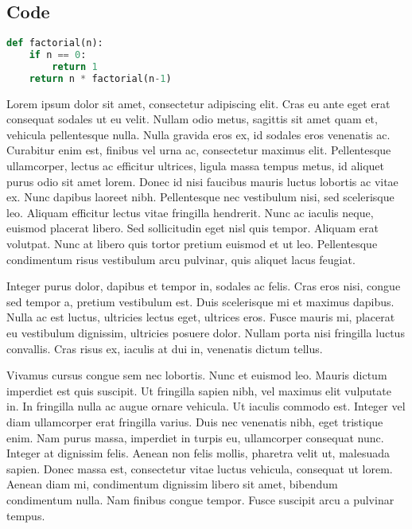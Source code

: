 \documentclass[a4paper,11pt]{article}
\begin{document}
\subsection*{Code}
\begin{lstlisting}[language=Python]
def factorial(n):
    if n == 0:
        return 1
    return n * factorial(n-1)
\end{lstlisting}



Lorem ipsum dolor sit amet, consectetur adipiscing elit. Cras eu ante
eget erat consequat sodales ut eu velit. Nullam odio metus, sagittis sit
 amet quam et, vehicula pellentesque nulla. Nulla gravida eros ex, id
sodales eros venenatis ac. Curabitur enim est, finibus vel urna ac,
consectetur maximus elit. Pellentesque ullamcorper, lectus ac efficitur
ultrices, ligula massa tempus metus, id aliquet purus odio sit amet
lorem. Donec id nisi faucibus mauris luctus lobortis ac vitae ex. Nunc
dapibus laoreet nibh. Pellentesque nec vestibulum nisi, sed scelerisque
leo. Aliquam efficitur lectus vitae fringilla hendrerit. Nunc ac iaculis
 neque, euismod placerat libero. Sed sollicitudin eget nisl quis tempor.
 Aliquam erat volutpat. Nunc at libero quis tortor pretium euismod et ut
 leo. Pellentesque condimentum risus vestibulum arcu pulvinar, quis
aliquet lacus feugiat.




Integer purus dolor, dapibus et tempor in, sodales ac felis. Cras eros
nisi, congue sed tempor a, pretium vestibulum est. Duis scelerisque mi
et maximus dapibus. Nulla ac est luctus, ultricies lectus eget, ultrices
 eros. Fusce mauris mi, placerat eu vestibulum dignissim, ultricies
posuere dolor. Nullam porta nisi fringilla luctus convallis. Cras risus
ex, iaculis at dui in, venenatis dictum tellus.




Vivamus cursus congue sem nec lobortis. Nunc et euismod leo. Mauris
dictum imperdiet est quis suscipit. Ut fringilla sapien nibh, vel
maximus elit vulputate in. In fringilla nulla ac augue ornare vehicula.
Ut iaculis commodo est. Integer vel diam ullamcorper erat fringilla
varius. Duis nec venenatis nibh, eget tristique enim. Nam purus massa,
imperdiet in turpis eu, ullamcorper consequat nunc. Integer at dignissim
 felis. Aenean non felis mollis, pharetra velit ut, malesuada sapien.
Donec massa est, consectetur vitae luctus vehicula, consequat ut lorem.
Aenean diam mi, condimentum dignissim libero sit amet, bibendum
condimentum nulla. Nam finibus congue tempor. Fusce suscipit arcu a
pulvinar tempus.
\end{document}
